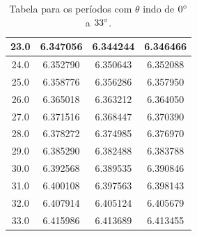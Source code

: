 \documentclass[12pt,a4paper]{article}
\begin{document}
\begin{table}[H]
\begin{center}
\begin{tabular}{|c|c|c|c|}
\hline
23.0 & 6.347056 & 6.344244 & 6.346466 \\
\hline
24.0 & 6.352790 & 6.350643 & 6.352088 \\
\hline
25.0 & 6.358776 & 6.356286 & 6.357950 \\
\hline
26.0 & 6.365018 & 6.363212 & 6.364050 \\
\hline
27.0 & 6.371516 & 6.368447 & 6.370390 \\
\hline
28.0 & 6.378272 & 6.374985 & 6.376970 \\
\hline
29.0 & 6.385290 & 6.382488 & 6.383788 \\
\hline
30.0 & 6.392568 & 6.389535 & 6.390846 \\
\hline
31.0 & 6.400108 & 6.397563 & 6.398143 \\
\hline
32.0 & 6.407914 & 6.405124 & 6.405679 \\
\hline
33.0 & 6.415986 & 6.413689 & 6.413455 \\
\hline
\end{tabular}
\end{center}
\caption{Tabela para os períodos com $\theta$ indo de $0\degree$ a $33\degree$.}
\end{table}
\newpage
\end{document}
